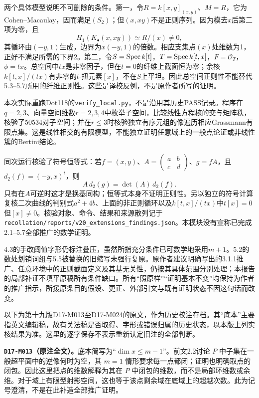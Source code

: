 两个具体模型说明不可删除的条件。第一，令$R=k[x,y]_{(x,y)}$、$M=R$，它为Cohen--Macaulay，因而满足$(S_2)$；但$(x,xy)$不是正则序列。因为模去$x$后第二项为零，且
\[
 H_1(K_\bullet(x,xy))\simeq R/(x)\ne0,
\]
其循环由$(-y,1)$生成，边界为$x(-y,1)$的倍数。相应支集点$(x)$处维数为1，正好不满足所需的下界2。第二，令$S=\operatorname{Spec} k[t]$，$T=\operatorname{Spec} k[t,x]$，$F=\mathcal O_T$，$\phi=tx$。总空间中$tx$是非零因子，但在$t=0$的纤维上截面恒为零；余核$k[t,x]/(tx)$有非零的$t$-扭元素$[x]$，不在$S$上平坦。因此总空间正则性不能替代5.3--5.7所用的纤维正则性。这些是译校反例，不是原作者所写的证明。

本次实际重跑Dot118的\texttt{verify\_local.py}，不是沿用其历史PASS记录。程序在$q=2,3$、向量空间维数$r=2,3,4$中枚举子空间，比较线性方程核的交与矩阵秩，核验了50534对子空间；并在$r\leq3$时核验独立有序元组的像遍历相应Grassmann有限点集。这是线性相交的有限模型，不能独立证明任意域上的一般点论证或非线性簇的Bertini结论。

同次运行核验了符号恒等式：若$f=(x,y)$、$A=\left(\begin{smallmatrix}a&b\\c&d\end{smallmatrix}\right)$、$g=fA$，且$d_2(f)=(-y,x)^t$，则
\[
 A\,d_2(g)=\det(A)\,d_2(f).
\]
只有在$A$可逆时这才是换基同构；恒等式本身不证明正则性。另以独立的符号计算复核二次曲线的判别式$a^2+4b$、上面的非正则循环以及$k[t,x]/(tx)$中$t[x]=0$但$[x]\ne0$。核验对象、命令、结果和来源散列记于\texttt{recollation/reports/v20\_extensions\_findings.json}。本模块没有宣称已完成2.1--5.7全部推广的数学证明。

4.3的手改阈值字形仍标注叠压，虽然所指充分条件已可数学地采用$m+1$。5.2的数处划销词组与5.5被替换的旧缩写未强行复原。原作者建议明确写出的3.1.1推广、任意环境中的正则截面定义及其基无关性，仍按其具体范围分别处理；本报告的局部补证不填平原稿所有条件缺口。所有“照原样”“证明基本不变”均保持为作者的推广指示，所援原条目的假设、更正、外部引文与既有证明状态不因这句话而改变。

以下为第十九版D17-M013至D17-M024的原文，作为历史校注存档。其“底本”主要指英文编辑稿，故有关法稿是否取得、字形或错误归属的历史状态，以本版上列实核结果为准。这里的逐字保存不表示重新认定旧注的全部判断。

\par\medskip\noindent\textbf{\texttt{D17-M013}（原注全文）。}底本简写为“$\dim x\leq m-1$”。前文2.2讨论 $P$ 中子集在一般超平面中的逆像何时为空，其 $m=1$ 情形要求每一点都闭；证明也明确取点的闭包。因此这里把点的维数解释为其在 $P$ 中闭包的维数，而不是局部环维数或余维。对于域上有限型射影空间，这也等于该点剩余域在底域上的超越次数。此为记号澄清，不是在此补造全部推广证明。

